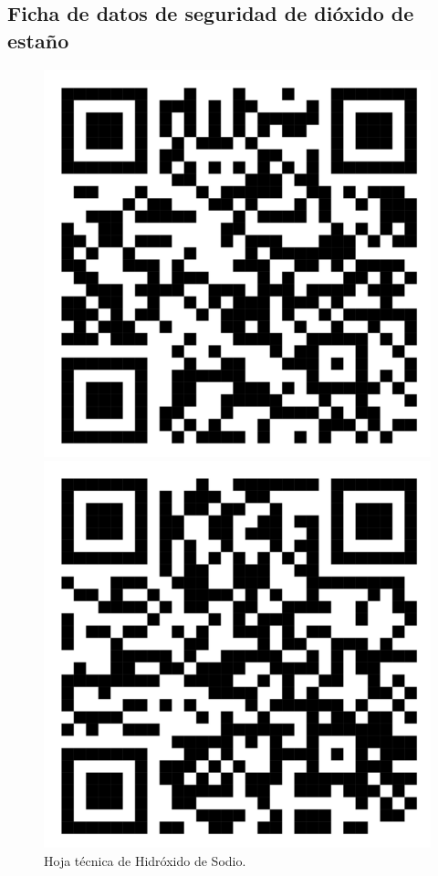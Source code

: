 \documentclass[12pt]{article}
\begin{document}
\subsection*{Ficha de datos de seguridad de dióxido de estaño}
\begin{figure}[htbp]
  \begin{minipage}{0.4\textwidth}
    \centering
    \includegraphics[width=\linewidth]{Imagenes/Hidroxido de sodio.png}
    \caption{Hoja técnica de Hidróxido de Sodio.}
    \label{fig:imagen1}
  \end{minipage}\hfill
  \begin{minipage}{0.4\textwidth}
    \centering
    \includegraphics[width=\linewidth]{Imagenes/SnCl4_5H2O_QR.png}

\end{minipage}
\end{figure}
\end{document}
